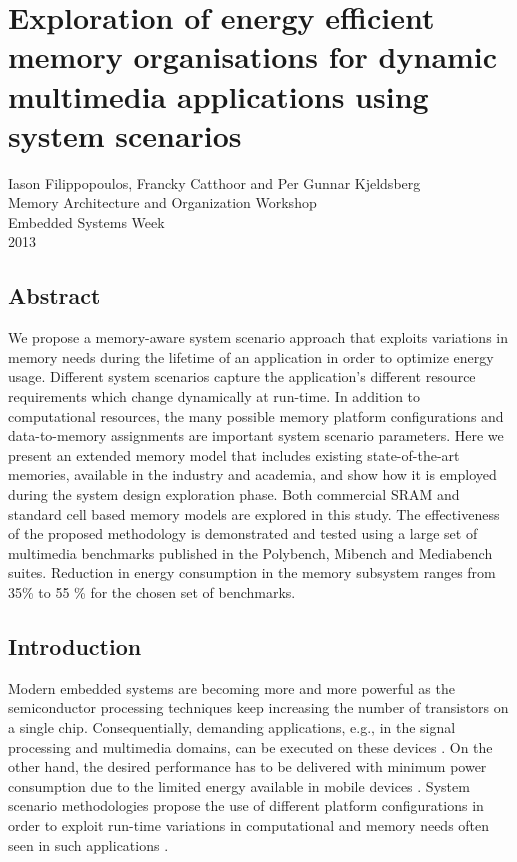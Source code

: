 \chapter{Exploration of energy efficient memory organisations for dynamic multimedia applications using system scenarios}

\begin{center}
Iason Filippopoulos, Francky Catthoor and Per Gunnar Kjeldsberg
\\
Memory Architecture and Organization Workshop
\\
Embedded Systems Week
\\
2013
\end{center}
\afterpage{\null\newpage}
\newpage

\vspace*{\fill}
\section*{\hspace*{\fill} Abstract \hspace*{\fill}}
We propose a memory-aware system scenario approach that exploits variations in memory needs during the lifetime of an application in order to optimize energy usage. Different system scenarios capture the application's different resource requirements which change dynamically at run-time. In addition to computational resources, the many possible memory platform configurations and data-to-memory assignments are important system scenario parameters. Here we present an extended memory model that includes existing state-of-the-art memories, available in the industry and academia, and show how it is employed during the system design exploration phase. Both commercial SRAM and standard cell based memory models are explored in this study. The effectiveness of the proposed methodology is demonstrated and tested using a large set of multimedia benchmarks published in the Polybench, Mibench and Mediabench suites. Reduction in energy consumption in the memory subsystem ranges from 35\% to 55 \% for the chosen set of benchmarks.
\vspace*{\fill}
\afterpage{\null\newpage}
\newpage

\section{Introduction}

Modern embedded systems are becoming more and more powerful as the semiconductor processing techniques keep increasing the number of transistors on a single chip. Consequentially, demanding applications, e.g., in the signal processing and multimedia domains, can be executed on these devices \cite{narasinga}. On the other hand, the desired performance has to be delivered with minimum power consumption due to the limited energy available in mobile devices \cite{tcm}. System scenario methodologies propose the use of different platform configurations in order to exploit run-time variations in computational and memory needs often seen in such applications \cite{tcm}.

